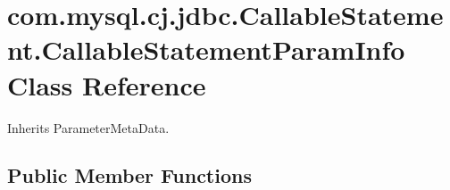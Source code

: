 \hypertarget{classcom_1_1mysql_1_1cj_1_1jdbc_1_1_callable_statement_1_1_callable_statement_param_info}{}\section{com.\+mysql.\+cj.\+jdbc.\+Callable\+Statement.\+Callable\+Statement\+Param\+Info Class Reference}
\label{classcom_1_1mysql_1_1cj_1_1jdbc_1_1_callable_statement_1_1_callable_statement_param_info}


Inherits Parameter\+Meta\+Data.

\subsection*{Public Member Functions}
